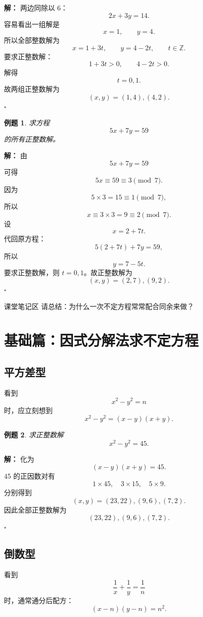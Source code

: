 \documentclass[11pt,a4paper,fontset=fandol]{ctexart}
\theoremstyle{formaltheorem}
\theoremstyle{formalexample}
\newtheorem{example}{例题}[section]
\newenvironment{solution}{\par\noindent\textbf{解：}}{\hfill$\square$\par}
\newcommand{\classblank}{\vspace{2.2cm}}
\begin{document}
\begin{solution}
两边同除以 $6$：
\[
2x+3y=14.
\]
容易看出一组解是
\[
x=1,\qquad y=4.
\]
所以全部整数解为
\[
x=1+3t,\qquad y=4-2t,\qquad t\in \mathbb{Z}.
\]
要求正整数解：
\[
1+3t>0,\qquad 4-2t>0.
\]
解得
\[
t=0,1.
\]
故两组正整数解为
\[
\boxed{(x,y)=(1,4),(4,2)}.
\]
\end{solution}

\begin{example}
求方程
\[
5x+7y=59
\]
的所有正整数解。
\end{example}

\begin{solution}
由
\[
5x+7y=59
\]
可得
\[
5x\equiv 59\equiv 3\pmod 7.
\]
因为
\[
5\times 3=15\equiv 1\pmod 7,
\]
所以
\[
x\equiv 3\times 3=9\equiv 2\pmod 7.
\]
设
\[
x=2+7t.
\]
代回原方程：
\[
5(2+7t)+7y=59,
\]
所以
\[
y=7-5t.
\]
要求正整数解，则 $t=0,1$。故正整数解为
\[
\boxed{(x,y)=(2,7),(9,2)}.
\]
\end{solution}

\begin{notebox}{课堂笔记区}
请总结：为什么一次不定方程常常配合同余来做？
\classblank
\end{notebox}

\section{基础篇：因式分解法求不定方程}

\subsection{平方差型}

看到
\[
x^2-y^2=n
\]
时，应立刻想到
\[
x^2-y^2=(x-y)(x+y).
\]

\begin{example}
求正整数解
\[
x^2-y^2=45.
\]
\end{example}

\begin{solution}
化为
\[
(x-y)(x+y)=45.
\]
45 的正因数对有
\[
1\times 45,\quad 3\times 15,\quad 5\times 9.
\]
分别得到
\[
(x,y)=(23,22),(9,6),(7,2).
\]
因此全部正整数解为
\[
\boxed{(23,22),(9,6),(7,2)}.
\]
\end{solution}

\subsection{倒数型}

看到
\[
\frac1x+\frac1y=\frac1n
\]
时，通常通分后配方：
\[
(x-n)(y-n)=n^2.
\]
\end{document}
